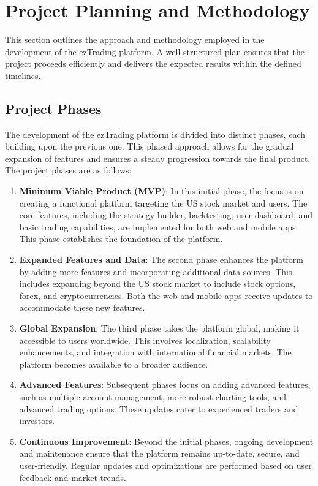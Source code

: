 \section{Project Planning and Methodology}

This section outlines the approach and methodology employed in the development of the ezTrading platform. A well-structured plan ensures that the project proceeds efficiently and delivers the expected results within the defined timelines.

\subsection{Project Phases}

The development of the ezTrading platform is divided into distinct phases, each building upon the previous one. This phased approach allows for the gradual expansion of features and ensures a steady progression towards the final product. The project phases are as follows:

\begin{enumerate}
  \item \textbf{Minimum Viable Product (MVP)}: In this initial phase, the focus is on creating a functional platform targeting the US stock market and users. The core features, including the strategy builder, backtesting, user dashboard, and basic trading capabilities, are implemented for both web and mobile apps. This phase establishes the foundation of the platform.

  \item \textbf{Expanded Features and Data}: The second phase enhances the platform by adding more features and incorporating additional data sources. This includes expanding beyond the US stock market to include stock options, forex, and cryptocurrencies. Both the web and mobile apps receive updates to accommodate these new features.

  \item \textbf{Global Expansion}: The third phase takes the platform global, making it accessible to users worldwide. This involves localization, scalability enhancements, and integration with international financial markets. The platform becomes available to a broader audience.

  \item \textbf{Advanced Features}: Subsequent phases focus on adding advanced features, such as multiple account management, more robust charting tools, and advanced trading options. These updates cater to experienced traders and investors.

  \item \textbf{Continuous Improvement}: Beyond the initial phases, ongoing development and maintenance ensure that the platform remains up-to-date, secure, and user-friendly. Regular updates and optimizations are performed based on user feedback and market trends.

\end{enumerate}

